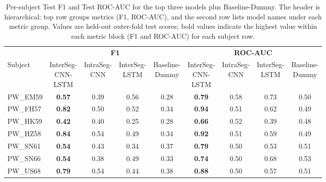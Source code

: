 \begin{table}[!t]
    \centering
    \caption{Per-subject Test F1 and Test ROC-AUC for the top three models plus Baseline-Dummy. The header is hierarchical: top row groups metrics (F1, ROC-AUC), and the second row lists model names under each metric group. Values are held-out outer-fold test scores; bold values indicate the highest value within each metric block (F1 and ROC-AUC) for each subject row.}
    \label{tab:subject_level_top_models_test_f1}
\begingroup
\scriptsize
\setlength{\tabcolsep}{2pt}
\renewcommand{\arraystretch}{1.05}
\begin{tabular*}{\textwidth}{@{\extracolsep{\fill}}lcccccccc}
\toprule
 & \multicolumn{4}{c}{\textbf{F1}} & \multicolumn{4}{c}{\textbf{ROC-AUC}} \\
\cmidrule(lr){2-5}\cmidrule(lr){6-9}
Subject & \shortstack{InterSeg-\\CNN-\\LSTM} & \shortstack{IntraSeg-\\CNN} & \shortstack{InterSeg-\\LSTM} & \shortstack{Baseline-\\Dummy} & \shortstack{InterSeg-\\CNN-\\LSTM} & \shortstack{IntraSeg-\\CNN} & \shortstack{InterSeg-\\LSTM} & \shortstack{Baseline-\\Dummy} \\
\midrule
PW\_EM59 & \textbf{0.57} & 0.39 & 0.56 & 0.28 & \textbf{0.79} & 0.58 & 0.73 & 0.50 \\
PW\_FH57 & \textbf{0.82} & 0.50 & 0.52 & 0.34 & \textbf{0.94} & 0.51 & 0.62 & 0.49 \\
PW\_HK59 & \textbf{0.42} & 0.40 & 0.25 & 0.28 & \textbf{0.66} & 0.52 & 0.39 & 0.48 \\
PW\_HZ58 & \textbf{0.84} & 0.54 & 0.49 & 0.34 & \textbf{0.92} & 0.51 & 0.59 & 0.49 \\
PW\_SN61 & \textbf{0.54} & 0.43 & 0.34 & 0.37 & \textbf{0.79} & 0.50 & 0.53 & 0.51 \\
PW\_SN66 & \textbf{0.54} & 0.38 & 0.49 & 0.33 & \textbf{0.74} & 0.50 & 0.68 & 0.53 \\
PW\_US68 & \textbf{0.79} & 0.54 & 0.44 & 0.38 & \textbf{0.88} & 0.50 & 0.57 & 0.51 \\
\bottomrule
\end{tabular*}
\endgroup

\end{table}

